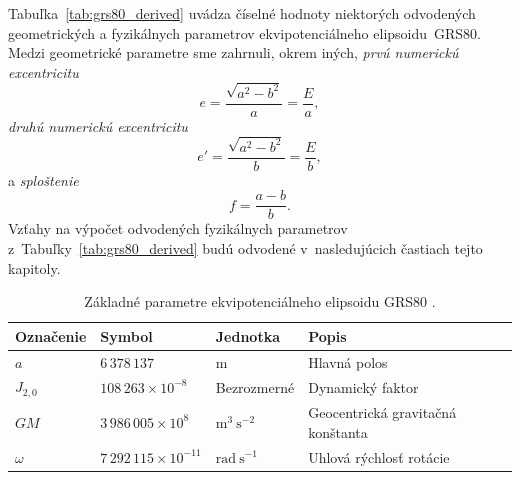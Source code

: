 \documentclass[a4paper, 12pt]{book}
\begin{document}
Tabuľka~\ref{tab:grs80_derived} uvádza číselné hodnoty niektorých odvodených geometrických 
a fyzikálnych parametrov ekvipotenciálneho elipsoidu~GRS80.  Medzi geometrické 
parametre sme zahrnuli, okrem iných, \emph{prvú numerickú excentricitu}
%
\begin{equation}
\label{eq:1st_eccentricity}
e = \frac{\sqrt{a^2 - b^2}}{a} = \frac{E}{a}{,}
\end{equation}
%
\emph{druhú numerickú excentricitu}
%
\begin{equation}
\label{eq:2nd_eccentricity}
e' = \frac{\sqrt{a^2 - b^2}}{b} = \frac{E}{b}{,}
\end{equation}
%
a \emph{sploštenie}
%
\begin{equation}
\label{eq:flattening}
f = \frac{a - b}{b}{.}
\end{equation}
%
Vzťahy na výpočet odvodených fyzikálnych parametrov 
z~Tabuľky~\ref{tab:grs80_derived} budú odvodené v~nasledujúcich častiach tejto 
kapitoly.

\begin{table}
\begin{center}
\caption{Základné parametre ekvipotenciálneho elipsoidu GRS80 
\parencite{GRS80}.}
\label{tab:grs80_fundamental}
\small
\begin{tabular}{l l l l}
\hline
Označenie & Symbol & Jednotka & Popis\\
\hline
$a$       & $6\,378\,137$ & m & Hlavná polos\\
$J_{2,0}$ & $108\,263 \times 10^{-8}$ & Bezrozmerné & Dynamický faktor\\
$GM$ & $3\,986\,005 \times 10^8$ & $\mathrm{m}^3 \ \mathrm{s}^{-2}$ 
& Geocentrická gravitačná konštanta\\
$\omega$ & $7\,292\,115 \times 10^{-11}$ & $\mathrm{rad} \ \mathrm{s}^{-1}$ 
& Uhlová rýchlosť rotácie\\
\hline
\end{tabular}
\end{center}
\end{table}
\end{document}
